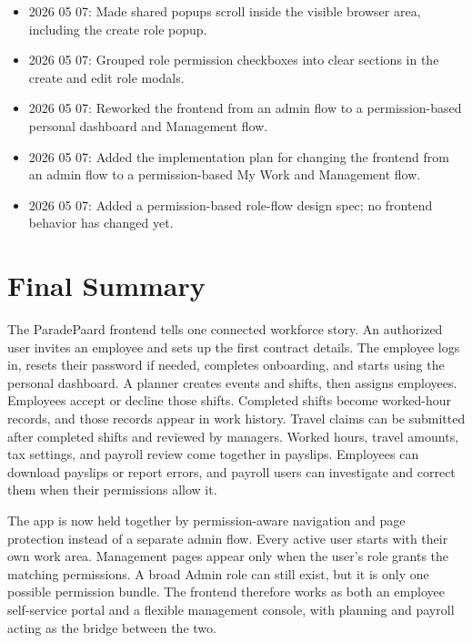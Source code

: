 \documentclass[11pt]{article}
\begin{document}
\begin{itemize}
    \item 2026 05 07: Made shared popups scroll inside the visible browser area, including the create role popup.
    \item 2026 05 07: Grouped role permission checkboxes into clear sections in the create and edit role modals.
    \item 2026 05 07: Reworked the frontend from an admin flow to a permission-based personal dashboard and Management flow.
    \item 2026 05 07: Added the implementation plan for changing the frontend from an admin flow to a permission-based My Work and Management flow.
    \item 2026 05 07: Added a permission-based role-flow design spec; no frontend behavior has changed yet.
\end{itemize}

\section{Final Summary}

The ParadePaard frontend tells one connected workforce story. An authorized user invites an employee and sets up the first contract details. The employee logs in, resets their password if needed, completes onboarding, and starts using the personal dashboard. A planner creates events and shifts, then assigns employees. Employees accept or decline those shifts. Completed shifts become worked-hour records, and those records appear in work history. Travel claims can be submitted after completed shifts and reviewed by managers. Worked hours, travel amounts, tax settings, and payroll review come together in payslips. Employees can download payslips or report errors, and payroll users can investigate and correct them when their permissions allow it.

The app is now held together by permission-aware navigation and page protection instead of a separate admin flow. Every active user starts with their own work area. Management pages appear only when the user's role grants the matching permissions. A broad Admin role can still exist, but it is only one possible permission bundle. The frontend therefore works as both an employee self-service portal and a flexible management console, with planning and payroll acting as the bridge between the two.
\end{document}
